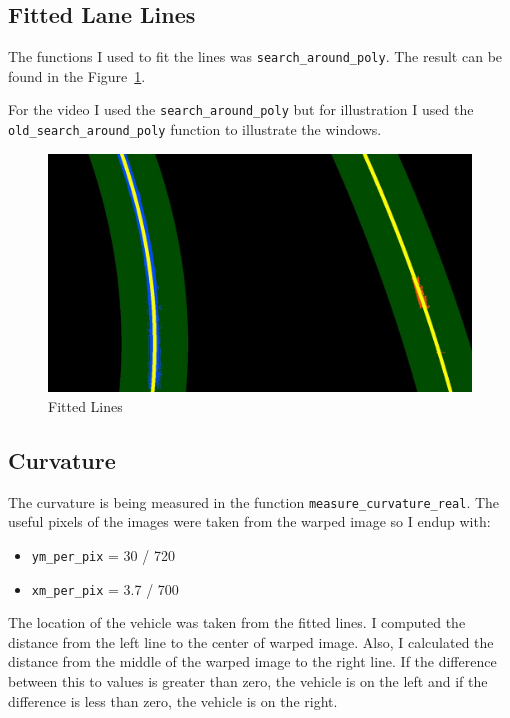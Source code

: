 \documentclass[11pt, a4paper]{article}
\begin{document}
\subsection{Fitted Lane Lines}%
\label{sub:fitted_lane_lines}

The functions I used to fit the lines was \texttt{search\_around\_poly}. The result can be found in the Figure~\ref{fig:fitted_lines}.


For the video I used the \texttt{search\_around\_poly} but for illustration I used the \texttt{old\_search\_around\_poly} function to illustrate the windows. 

\begin{figure}[htb!]
	\centering
	\includegraphics[width=0.8\linewidth]{fitted_lines}
	\caption{Fitted Lines}
	\label{fig:fitted_lines}
\end{figure}

\subsection{Curvature}%
\label{sub:curvature}

The curvature is being measured in the function \texttt{measure\_curvature\_real}. The useful pixels of the images were taken from the warped image so I endup with:

\begin{itemize}
	\item \texttt{ym\_per\_pix} = 30 / 720
	\item \texttt{xm\_per\_pix} = 3.7 / 700
\end{itemize}

The location of the vehicle was taken from the fitted lines. I computed the distance from the left line to the center of warped image. Also, I calculated the distance from the middle of the warped image to the right line. If the difference between this to values is greater than zero, the vehicle is on the left and if the difference is less than zero, the vehicle is on the right.
\end{document}
